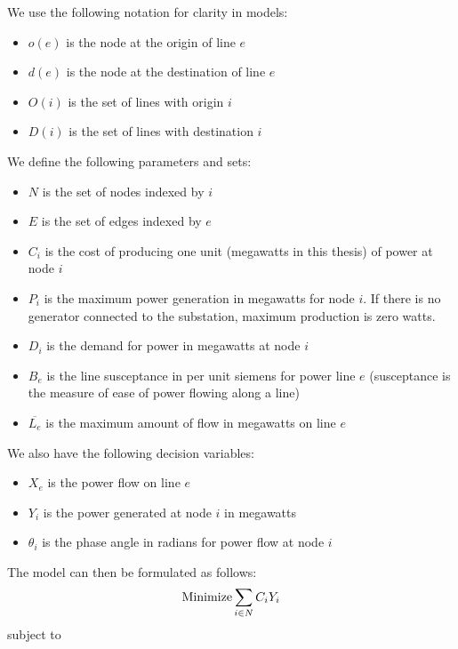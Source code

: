 We use the following notation for clarity in models:
\begin{itemize}
	\item $o(e)$ is the node at the origin of line $e$ 
	\item $d(e)$ is the node at the destination of line $e$
	\item $O(i)$ is the set of lines with origin $i$
	\item $D(i)$ is the set of lines with destination $i$
\end{itemize}
We define the following parameters and sets:
\begin{itemize}
	\item $N$ is the set of nodes indexed by $i$
	\item $E$ is the set of edges indexed by $e$
	\item $C_i$ is the cost of producing one unit (megawatts in this thesis) of power at node $i$
	\item $P_i$ is the maximum power generation in megawatts for node $i$. If there is no generator connected to the substation, maximum production is zero watts.
	\item $D_i$ is the demand for power in megawatts at node $i$
	\item $B_e$ is the line susceptance in per unit siemens for power line $e$ (susceptance is the measure of ease of power flowing along a line)
	\item $\overline{L_e}$ is the maximum amount of flow in megawatts on line $e$
	
\end{itemize}
We also have the following decision variables:
\begin{itemize}
	\item $X_e$ is the power flow on line $e$ 
	\item $Y_i$ is the power generated at node $i$ in megawatts
	\item $\theta_i$ is the phase angle in radians for power flow at node $i$ 
\end{itemize}
The model can then be formulated as follows: 
\begin{equation}
\textnormal{Minimize} \sum_{i\in N} C_i Y_i
\end{equation} 
subject to
